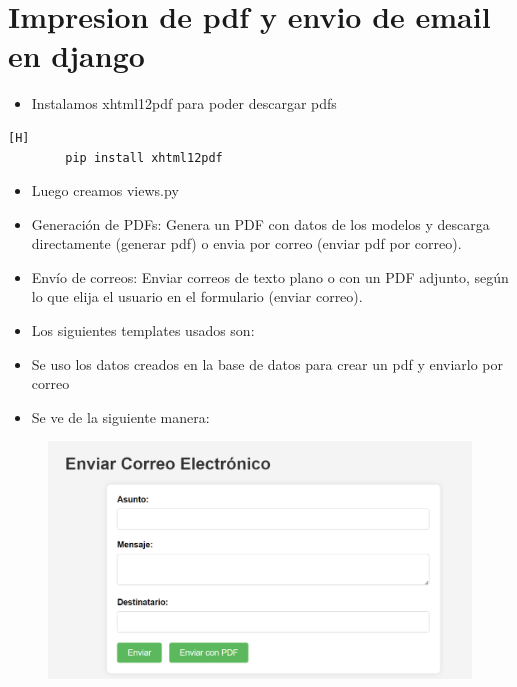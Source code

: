 \documentclass{article}
\begin{document}
\section{Impresion de pdf y envio de email en django}
	\begin{itemize}
		\item Instalamos xhtml12pdf para poder descargar pdfs
	\end{itemize}
	\begin{lstlisting}[language=bash,caption={Instalar xhtml12pdf}][H]
		pip install xhtml12pdf
	\end{lstlisting}
	\begin{itemize}
		\item Luego creamos views.py
	\end{itemize}	
	
	\begin{itemize}
		\item Generación de PDFs: Genera un PDF con datos de los modelos y descarga directamente (generar pdf) o envia por correo (enviar pdf por correo).
		\item Envío de correos: Enviar correos de texto plano o con un PDF adjunto, según lo que elija el usuario en el formulario (enviar correo).
		\item Los siguientes templates usados son:
	\end{itemize}	
	
	
	\begin{itemize}
		\item Se uso los datos creados en la base de datos para crear un pdf y enviarlo por correo
		\item Se ve de la siguiente manera:
	\end{itemize}	
	\begin{figure}[H]
		\centering
		\includegraphics[width=1.0\textwidth,keepaspectratio]{img/C6.png}
	\end{figure}
\end{document}

